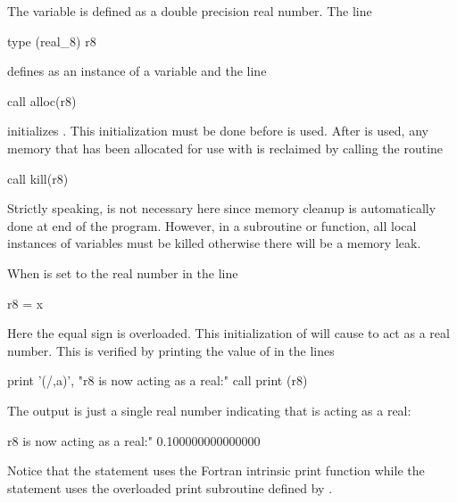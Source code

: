 \documentclass{hitec}     %
\begin{document}
The variable  is defined as a double precision real number. The line
\begin{example}
  type (real_8) r8
\end{example}
defines  as an instance of a  variable and the line
\begin{example}
  call alloc(r8)
\end{example}
initializes . This initialization must be done before  is used. After  is used,
any memory that has been allocated for use with  is reclaimed by calling the 
routine
\begin{example}
  call kill(r8)
\end{example}
Strictly speaking,  is not necessary here since memory cleanup is automatically done at end
of the program. However, in a subroutine or function, all local instances of  variables
must be killed otherwise there will be a memory leak.

When  is set to the real number  in the line
\begin{example}
    r8 = x
\end{example}
Here the equal sign is overloaded. This initialization of 
will cause  to act as a real number. This is verified by printing the value of  in the lines
\begin{example}
  print '(/,a)', "r8 is now acting as a real:"
  call print (r8)
\end{example}
The output is just a single real number indicating that  is acting as a real:
\begin{example}
  r8 is now acting as a real:"
  0.100000000000000
\end{example}
Notice that the  statement uses the Fortran intrinsic print function while the  statement uses the overloaded print subroutine defined by .
\end{document}
